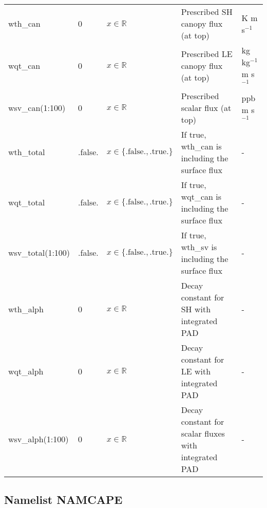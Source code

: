 \documentclass[twoside,11pt,fleqn,a4paper,english,openright]{report}
\begin{document}
\begin{center}
\begin{supertabular}{|l|p{1.5cm}|p{3.5cm}|p{6cm}|l|}
  wth\_can	& 0			& $x \in \mathbb{R}$							& Prescribed SH canopy flux (at top) & K m s$^{-1}$ \\
  wqt\_can	& 0			& $x \in \mathbb{R}$							& Prescribed LE canopy flux (at top) & kg kg$^{-1}$ m s$^{-1}$ \\
  wsv\_can(1:100)	& 0			& $x \in \mathbb{R}$					& Prescribed scalar flux (at top) & ppb m s$^{-1}$ \\
  wth\_total & .false.	& $x\in\{\text{.false.},\text{.true.}\}$		& If true, wth\_can is including the surface flux	& -\\
  wqt\_total & .false.	& $x\in\{\text{.false.},\text{.true.}\}$		& If true, wqt\_can is including the surface flux	& -\\
  wsv\_total(1:100) & .false.	& $x\in\{\text{.false.},\text{.true.}\}$& If true, wth\_sv is including the surface flux	& -\\
  wth\_alph	& 0			& $x \in \mathbb{R}$							& Decay constant for SH with integrated PAD & - \\
  wqt\_alph	& 0			& $x \in \mathbb{R}$							& Decay constant for LE with integrated PAD & - \\
  wsv\_alph(1:100)	& 0			& $x \in \mathbb{R}$					& Decay constant for scalar fluxes with integrated PAD & - \\
\end{supertabular}
\end{center}

\subsection{Namelist NAMCAPE}\label{par:cape}
\end{document}
